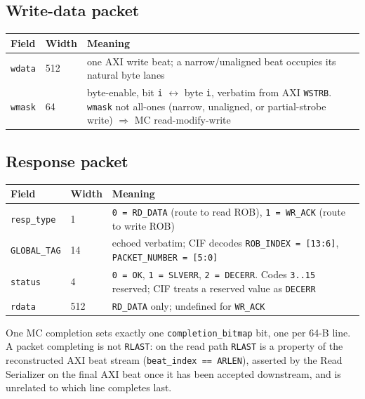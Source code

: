 \subsection{Write-data packet}

\begin{center}
\begin{tabular}{lp{1.6cm}p{8.4cm}}
\toprule
\textbf{Field} & \textbf{Width} & \textbf{Meaning}\\
\midrule
\texttt{wdata} & 512 & one AXI write beat; a narrow/unaligned beat occupies its natural byte lanes\\
\texttt{wmask} & 64  & byte-enable, bit \texttt{i} $\leftrightarrow$ byte \texttt{i}, verbatim from AXI \texttt{WSTRB}.  \texttt{wmask} not all-ones (narrow, unaligned, or partial-strobe write) $\Rightarrow$ MC read-modify-write\\
\bottomrule
\end{tabular}
\end{center}

\subsection{Response packet}
\label{sec:respformat}

\begin{center}
\begin{tabular}{lp{1.6cm}p{8.4cm}}
\toprule
\textbf{Field} & \textbf{Width} & \textbf{Meaning}\\
\midrule
\texttt{resp\_type}  & 1  & \texttt{0 = RD\_DATA} (route to read ROB), \texttt{1 = WR\_ACK} (route to write ROB)\\
\texttt{GLOBAL\_TAG} & 14 & echoed verbatim; CIF decodes \texttt{ROB\_INDEX = [13:6]}, \texttt{PACKET\_NUMBER = [5:0]}\\
\texttt{status}      & 4  & \texttt{0 = OK}, \texttt{1 = SLVERR}, \texttt{2 = DECERR}.  Codes \texttt{3..15} reserved; CIF treats a reserved value as \texttt{DECERR}\\
\texttt{rdata}       & 512 & \texttt{RD\_DATA} only; undefined for \texttt{WR\_ACK}\\
\bottomrule
\end{tabular}
\end{center}

\noindent One MC completion sets exactly one \texttt{completion\_bitmap} bit,
one per 64-B line.  A packet completing is not \texttt{RLAST}: on the read
path \texttt{RLAST} is a property of the reconstructed AXI beat stream
(\texttt{beat\_index == ARLEN}), asserted by the Read Serializer on the final
AXI beat once it has been accepted downstream, and is unrelated to which line
completes last.

